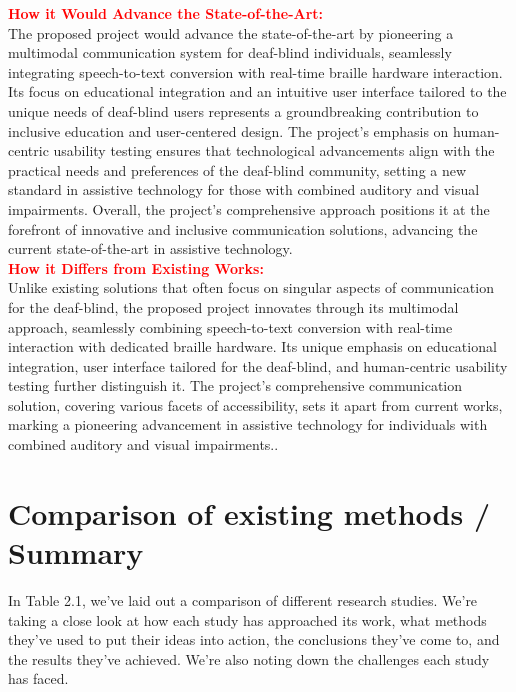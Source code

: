 \documentclass[12pt,a4paper]{report}
\begin{document}
\noindent
\textbf{\textcolor{red}{How it Would Advance the State-of-the-Art:}} \\
The proposed project would advance the state-of-the-art by pioneering a multimodal communication system for deaf-blind individuals, seamlessly integrating speech-to-text conversion with real-time braille hardware interaction. Its focus on educational integration and an intuitive user interface tailored to the unique needs of deaf-blind users represents a groundbreaking contribution to inclusive education and user-centered design. The project's emphasis on human-centric usability testing ensures that technological advancements align with the practical needs and preferences of the deaf-blind community, setting a new standard in assistive technology for those with combined auditory and visual impairments. Overall, the project's comprehensive approach positions it at the forefront of innovative and inclusive communication solutions, advancing the current state-of-the-art in assistive technology. \\

\noindent
\textbf{\textcolor{red}{How it Differs from Existing Works:}} \\
Unlike existing solutions that often focus on singular aspects of communication for the deaf-blind, the proposed project innovates through its multimodal approach, seamlessly combining speech-to-text conversion with real-time interaction with dedicated braille hardware. Its unique emphasis on educational integration, user interface tailored for the deaf-blind, and human-centric usability testing further distinguish it. The project's comprehensive communication solution, covering various facets of accessibility, sets it apart from current works, marking a pioneering advancement in assistive technology for individuals with combined auditory and visual impairments.. 
\section{Comparison of existing methods / Summary}
In Table 2.1, we've laid out a comparison of different research studies. We're taking a close look at how each study has approached its work, what methods they've used to put their ideas into action, the conclusions they've come to, and the results they've achieved. We're also noting down the challenges each study has faced.
\end{document}
